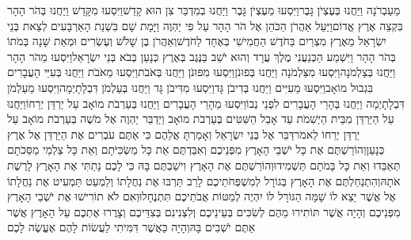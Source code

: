 \documentclass[../main/main.tex]{subfiles}
\begin{document}
\begin{multicols*}{\ncols}
מֵעַבְרֹנָה וַיַּחֲנוּ בְּעֶצְיֹן גָּבֶר\PreVerseSpace{}וַיִּסְעוּ מֵעֶצְיֹן גָּבֶר וַיַּחֲנוּ בְמִדְבַּר צִן הוּא קָדֵשׁ\PreVerseSpace{}וַיִּסְעוּ מִקָּדֵשׁ וַיַּחֲנוּ בְּהֹר הָהָר בִּקְצֵה אֶרֶץ אֱדוֹם\PreVerseSpace{}וַיַּעַל אַהֲרֹן הַכֹּהֵן אֶל הֹר הָהָר עַל פִּי יַהְוֶה וַיָּמָת שָׁם בִּשְׁנַת הָאַרְבָּעִים לְצֵאת בְּנֵי יִשְׂרָאֵל מֵאֶרֶץ מִצְרַיִם בַּחֹדֶשׁ הַחֲמִישִׁי בְּאֶחָד לַחֹדֶשׁ\PreVerseSpace{}וְאַהֲרֹן בֶּן שָׁלֹשׁ וְעֶשְׂרִים וּמְאַת שָׁנָה בְּמֹתוֹ בְּהֹר הָהָר \ClosedSection{}וַיִּשְׁמַע הַכְּנַעֲנִי מֶלֶךְ עֲרָד וְהוּא יֹשֵׁב בַּנֶּגֶב בְּאֶרֶץ כְּנָעַן בְּבֹא בְּנֵי יִשְׂרָאֵל\PreVerseSpace{}וַיִּסְעוּ מֵהֹר הָהָר וַיַּחֲנוּ בְּצַלְמֹנָה\PreVerseSpace{}וַיִּסְעוּ מִצַּלְמֹנָה וַיַּחֲנוּ בְּפוּנֹן\PreVerseSpace{}וַיִּסְעוּ מִפּוּנֹן וַיַּחֲנוּ בְּאֹבֹת\PreVerseSpace{}וַיִּסְעוּ מֵאֹבֹת וַיַּחֲנוּ בְּעִיֵּי הָעֲבָרִים בִּגְבוּל מוֹאָב\PreVerseSpace{}וַיִּסְעוּ מֵעִיִּים וַיַּחֲנוּ בְּדִיבֹן גָּד\PreVerseSpace{}וַיִּסְעוּ מִדִּיבֹן גָּד וַיַּחֲנוּ בְּעַלְמֹן דִּבְלָתָיְמָה\PreVerseSpace{}וַיִּסְעוּ מֵעַלְמֹן דִּבְלָתָיְמָה וַיַּחֲנוּ בְּהָרֵי הָעֲבָרִים לִפְנֵי נְבוֹ\PreVerseSpace{}וַיִּסְעוּ מֵהָרֵי הָעֲבָרִים וַיַּחֲנוּ בְּעַרְבֹת מוֹאָב עַל יַרְדֵּן יְרֵחוֹ\PreVerseSpace{}וַיַּחֲנוּ עַל הַיַּרְדֵּן מִבֵּית הַיְשִׁמֹת עַד אָבֵל הַשִּׁטִּים בְּעַרְבֹת מוֹאָב \ClosedSection{}וַיְדַבֵּר יַהְוֶה אֶל מֹשֶׁה בְּעַרְבֹת מוֹאָב עַל יַרְדֵּן יְרֵחוֹ לֵאמֹר\PreVerseSpace{}דַּבֵּר אֶל בְּנֵי יִשְׂרָאֵל וְאָמַרְתָּ אֲלֵהֶם כִּי אַתֶּם עֹבְרִים אֶת הַיַּרְדֵּן אֶל אֶרֶץ כְּנָעַן\PreVerseSpace{}וְהוֹרַשְׁתֶּם אֶת כָּל יֹשְׁבֵי הָאָרֶץ מִפְּנֵיכֶם וְאִבַּדְתֶּם אֵת כָּל מַשְׂכִּיֹּתָם וְאֵת כָּל צַלְמֵי מַסֵּכֹתָם תְּאַבֵּדוּ וְאֵת כָּל בָּמֹתָם תַּשְׁמִידוּ\PreVerseSpace{}וְהוֹרַשְׁתֶּם אֶת הָאָרֶץ וִישַׁבְתֶּם בָּהּ כִּי לָכֶם נָתַתִּי אֶת הָאָרֶץ לָרֶשֶׁת אֹתָהּ\PreVerseSpace{}וְהִתְנַחַלְתֶּם אֶת הָאָרֶץ בְּגוֹרָל לְמִשְׁפְּחֹתֵיכֶם לָרַב תַּרְבּוּ אֶת נַחֲלָתוֹ וְלַמְעַט תַּמְעִיט אֶת נַחֲלָתוֹ אֶל אֲשֶׁר יֵצֵא לוֹ שָׁמָּה הַגּוֹרָל לוֹ יִהְיֶה לְמַטּוֹת אֲבֹתֵיכֶם תִּתְנֶחָלוּ\PreVerseSpace{}וְאִם לֹא תוֹרִישׁוּ אֶת יֹשְׁבֵי הָאָרֶץ מִפְּנֵיכֶם וְהָיָה אֲשֶׁר תּוֹתִירוּ מֵהֶם לְשִׂכִּים בְּעֵינֵיכֶם וְלִצְנִינִם בְּצִדֵּיכֶם וְצָרֲרוּ אֶתְכֶם עַל הָאָרֶץ אֲשֶׁר אַתֶּם יֹשְׁבִים בָּהּ\PreVerseSpace{}וְהָיָה כַּאֲשֶׁר דִּמִּיתִי לַעֲשׂוֹת לָהֶם אֶעֱשֶׂה לָכֶם\OpenSection{}\par

\end{multicols*}
\end{document}
